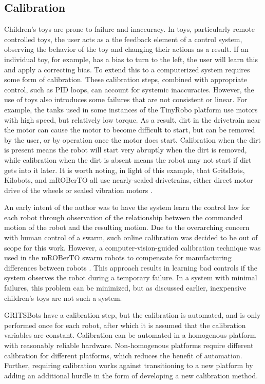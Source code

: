 \subsection{Calibration} \label{section:Calibration}

Children's toys are prone to failure and inaccuracy.
In toys, particularly remote controlled toys, the user acts as a the feedback element of a control system, observing the behavior of the toy and changing their actions as a result. 
If an individual toy, for example, has a bias to turn to the left, the user will learn this and apply a correcting bias.
To extend this to a computerized system requires some form of calibration. 
These calibration steps, combined with appropriate control, such as PID loops, can account for systemic inaccuracies. 
However, the use of toys also introduces some failures that are not consistent or linear. 
For example, the tanks used in some instances of the TinyRobo platform use motors with high speed, but relatively low torque. 
As a result, dirt in the drivetrain near the motor can cause the motor to become difficult to start, but can be removed by the user, or by operation once the motor does start. 
Calibration when the dirt is present means the robot will start very abruptly when the dirt is removed, while calibration when the dirt is absent means the robot may not start if dirt gets into it later. 
It is worth noting, in light of this example, that GritsBots, Kilobots, and mROBerTO all use nearly-sealed drivetrains, either direct motor drive of the wheels or sealed vibration motors \citep{rubenstein2014kilobot, pickem2015gritsbot, Kim2016mROBerTOAM}. 

An early intent of the author was to have the system learn the control law for each robot through observation of the relationship between the commanded motion of the robot and the resulting motion. 
Due to the overarching concern with human control of a swarm, such online calibration was decided to be out of scope for this work. 
However, a computer-vision-guided calibration technique was used in the mROBerTO swarm robots to compensate for manufacturing differences between robots \citep{Kim2016mROBerTOAM}. 
This approach results in learning bad controls if the system observes the robot during a temporary failure. 
In a system with minimal failures, this problem can be minimized, but as discussed earlier, inexpensive children's toys are not such a system. 

GRITSBots have a calibration step, but the calibration is automated, and is only performed once for each robot, after which it is assumed that the calibration variables are constant.
Calibration can be automated in a homogenous platform with reasonably reliable hardware. 
Non-homogenous platforms require different calibration for different platforms, which reduces the benefit of automation. 
Further, requiring calibration works against transitioning to a new platform by adding an additional hurdle in the form of developing a new calibration method.

